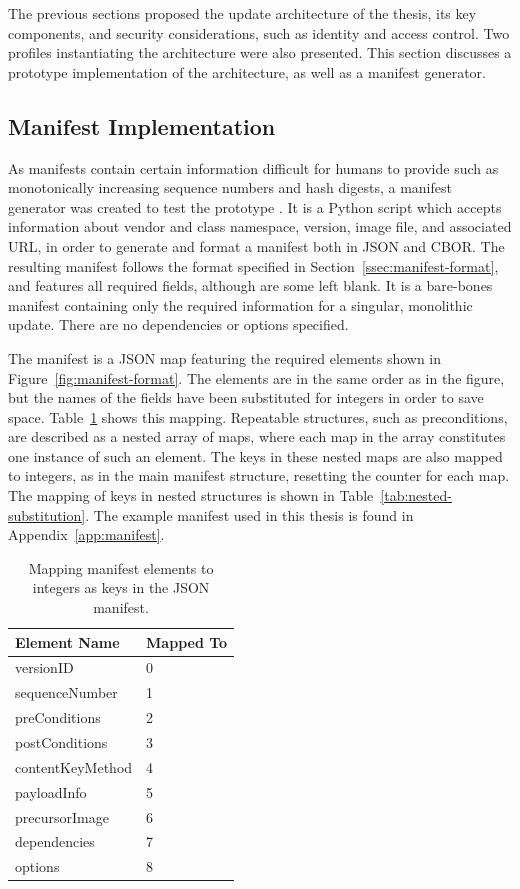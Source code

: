 \documentclass[0-thesis.tex]{subfiles}
\begin{document}
The previous sections proposed the update architecture of the thesis, its key components,
and security considerations, such as identity and access control. Two profiles
instantiating the architecture were also presented. This section discusses a prototype
implementation of the architecture, as well as a manifest generator. 

\subsection{Manifest Implementation}
\label{ssec:manifest-implementation}
As manifests contain certain information difficult for humans to provide such as
monotonically increasing sequence numbers and hash digests, a manifest generator was
created to test the prototype \parencite{manifest-generator}. It is a Python script which
accepts information about vendor and class namespace, version, image file, and associated
URL, in order to generate and format a manifest both in JSON and CBOR. The resulting
manifest follows the format specified in Section~\ref{ssec:manifest-format}, and features
all required fields, although are some left blank. It is a bare-bones manifest containing
only the required information for a singular, monolithic update. There are no dependencies
or options specified.

The manifest is a JSON map featuring the required elements shown in
Figure~\ref{fig:manifest-format}. The elements are in the same order as in the figure, but
the names of the fields have been substituted for integers in order to save space.
Table~\ref{tab:manifest-substitution} shows this mapping. Repeatable structures, such as
preconditions, are described as a nested array of maps, where each map in the array
constitutes one instance of such an element. The keys in these nested maps are also mapped
to integers, as in the main manifest structure, resetting the counter for each map. The
mapping of keys in nested structures is shown in Table~\ref{tab:nested-substitution}. The
example manifest used in this thesis is found in Appendix~\ref{app:manifest}. 

\begin{longtable}[]{@{}ll@{}}
    \caption{Mapping manifest elements to integers as keys in the JSON manifest.}
    \label{tab:manifest-substitution}\\
    \toprule
    Element Name & Mapped To\tabularnewline
    \midrule
    \endhead
    versionID & 0\tabularnewline
    sequenceNumber & 1\tabularnewline
    preConditions & 2\tabularnewline
    postConditions & 3\tabularnewline
    contentKeyMethod & 4\tabularnewline
    payloadInfo & 5\tabularnewline
    precursorImage & 6\tabularnewline
    dependencies & 7\tabularnewline
    options & 8\tabularnewline
    \bottomrule
\end{longtable}
\end{document}
